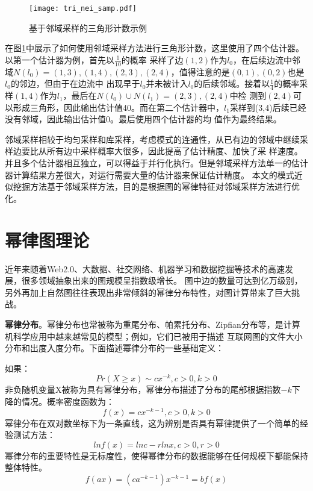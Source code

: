 \documentclass[master]{thesis-uestc}
\begin{document}
\begin{figure}
    \texttt{[image: tri\_nei\_samp.pdf]}
	\caption{基于邻域采样的三角形计数示例}
	\label{fig:tri_nei}
\end{figure}
    在图\ref{fig:tri_nei}中展示了如何使用邻域采样方法进行三角形计数，这里使用了四个估计器。以第一个估计器为例，首先以$\frac{1}{10}$的概率
采样了边$(1,2)$作为$l_0$，在后续边流中邻域$N(l_0)={(1,3),(1,4),(2,3),(2,4)}$，值得注意的是$(0,1),(0,2)$也是$l_0$的邻边，但由于在边流中
出现早于$l_0$并未被计入$l_0$的后续邻域。接着以$\frac{1}{4}$的概率采样$(1,4)$作为$l_1$，最后在$N(l_0) \cup N(l_1) = {(2,3),(2,4)}$中检
测到$(2,4)$可以形成三角形，因此输出估计值40。而在第二个估计器中，$l_1$采样到(3,4)后续已经没有邻域，因此输出估计值0。最后使用四个估计器的均
值作为最终结果。
    
    邻域采样相较于均匀采样和库采样，考虑模式的连通性，从已有边的邻域中继续采样边要比从所有边中采样概率大很多，因此提高了估计精度、加快了采
样速度。并且多个估计器相互独立，可以得益于并行化执行。但是邻域采样方法单一的估计器计算结果方差很大，对运行需要大量的估计器来保证估计精度。
本文的模式近似挖掘方法基于邻域采样方法，目的是根据图的幂律特征对邻域采样方法进行优化。

\section{幂律图理论}
\label{sec:pow-law-graph}
    近年来随着Web2.0、大数据、社交网络、机器学习和数据挖掘等技术的高速发展，很多领域抽象出来的图规模呈指数级增长。
图中边的数量可达到亿万级别，另外再加上自然图往往表现出非常倾斜的幂律分布特性，对图计算带来了巨大挑战。
    
    \textbf{幂律分布}。幂律分布也常被称为重尾分布、帕累托分布、Zipfian分布等，是计算机科学应用中越来越常见的模型；例如，它们已被用于描述
互联网图的文件大小分布和出度入度分布。下面描述幂律分布的一些基础定义：

    如果：
\begin{equation*}
    Pr(X \ge x) \sim cx^{-k}, c > 0, k > 0
\end{equation*}
非负随机变量X被称为具有幂律分布，幂律分布描述了分布的尾部根据指数$-k$下降的情况。概率密度函数为：
\begin{equation*}
    f(x) = cx^{-k-1}, c > 0, k > 0
\end{equation*}
幂律分布在双对数坐标下为一条直线，这为辨别是否具有幂律提供了一个简单的经验测试方法：
\begin{equation*}
    lnf(x) = lnc-rlnx, c > 0, r > 0
\end{equation*}
幂律分布的重要特性是无标度性，使得幂律分布的数据能够在任何规模下都能保持整体特性。
\begin{equation*}
    f(ax) = (ca^{-k-1})x^{-k-1}=bf(x)
\end{equation*}
\end{document}
